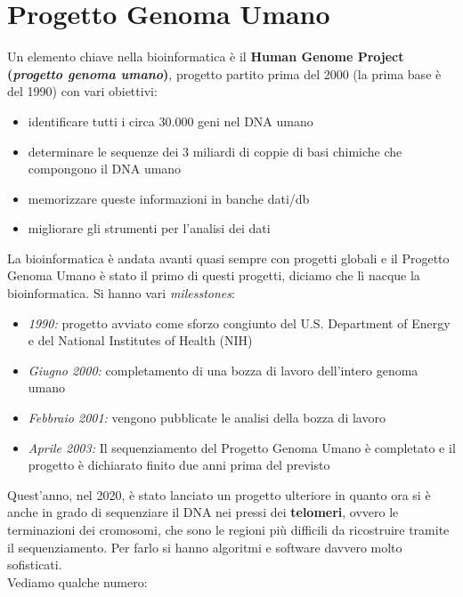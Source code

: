 \documentclass[a4paper,12pt, oneside]{book}
\begin{document}
\section{Progetto Genoma Umano}
Un elemento chiave nella bioinformatica è il \textbf{Human Genome Project
  (\textit{progetto genoma umano})}, progetto partito prima del 2000 (la prima
base è del 1990) con vari obiettivi:
\begin{itemize}
  \item identificare tutti i circa 30.000 geni nel DNA umano
  \item determinare le sequenze dei 3 miliardi di coppie di basi chimiche che
  compongono il DNA umano
  \item memorizzare queste informazioni in banche dati/db
  \item migliorare gli strumenti per l'analisi dei dati 
\end{itemize}
La bioinformatica è andata avanti quasi sempre con progetti globali e il
Progetto Genoma Umano è stato il primo di questi progetti, diciamo che lì nacque
la bioinformatica. Si hanno vari \textit{milesstones}:
\begin{itemize}
  \item \textit{1990:} progetto avviato come sforzo congiunto del U.S. Department of
  Energy e del National Institutes of Health (NIH) 
  \item \textit{Giugno 2000:} completamento di una bozza di lavoro dell'intero
  genoma umano
  \item \textit{Febbraio 2001:} vengono pubblicate le analisi della bozza di
  lavoro 
  \item \textit{Aprile 2003:} Il sequenziamento del Progetto Genoma Umano è
  completato e il progetto è dichiarato finito due anni prima del previsto  
\end{itemize}
Quest'anno, nel 2020, è stato lanciato un progetto ulteriore in quanto ora si è
anche in grado di sequenziare il DNA nei pressi dei \textbf{telomeri}, ovvero le
terminazioni dei cromosomi, che sono le regioni più difficili da ricostruire
tramite il sequenziamento. Per farlo si hanno algoritmi e software davvero molto
sofisticati.\\
Vediamo qualche numero:
\end{document}
